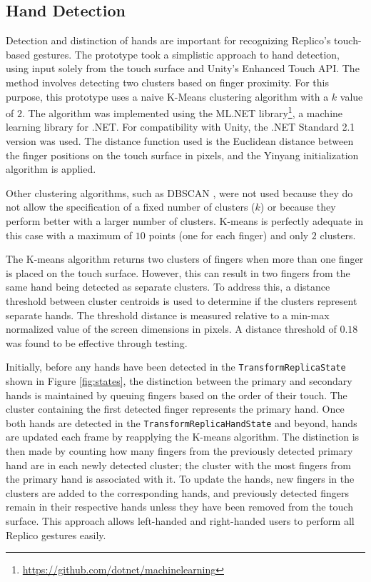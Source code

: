     \subsection{Hand Detection} \label{sec:hand}

        Detection and distinction of hands are important for recognizing Replico's touch-based gestures. The prototype took a simplistic approach to hand detection, using input solely from the touch surface and Unity's Enhanced Touch API. The method involves detecting two clusters based on finger proximity. For this purpose, this prototype uses a naive K-Means clustering algorithm \cite{zbMATH03340881, lloydLeastSquaresQuantization1982, 1571980074621944832} with a $k$ value of $2$. The algorithm was implemented using the ML.NET library\footnote{\url{https://github.com/dotnet/machinelearning}}, a machine learning library for .NET. For compatibility with Unity, the .NET Standard 2.1 version was used. The distance function used is the Euclidean distance between the finger positions on the touch surface in pixels, 
        and the Yinyang initialization algorithm \cite{pmlr-v37-ding15} is applied.
    
        Other clustering algorithms, such as DBSCAN \cite{ester1996density}, were not used because they do not allow the specification of a fixed number of clusters ($k$) or because they perform better with a larger number of clusters. K-means is perfectly adequate in this case with a maximum of $10$ points (one for each finger) and only $2$ clusters.
    
        The K-means algorithm returns two clusters of fingers when more than one finger is placed on the touch surface. However, this can result in two fingers from the same hand being detected as separate clusters. To address this, a distance threshold between cluster centroids is used to determine if the clusters represent separate hands. The threshold distance is measured relative to a min-max normalized value of the screen dimensions in pixels. A distance threshold of $0.18$ was found to be effective through testing.
    
        Initially, before any hands have been detected in the \lstinline{TransformReplicaState} shown in Figure \ref{fig:states}, the distinction between the primary and secondary hands is maintained by queuing fingers based on the order of their touch. The cluster containing the first detected finger represents the primary hand. Once both hands are detected in the \lstinline{TransformReplicaHandState} and beyond, hands are updated each frame by reapplying the K-means algorithm. The distinction is then made by counting how many fingers from the previously detected primary hand are in each newly detected cluster; the cluster with the most fingers from the primary hand is associated with it. To update the hands, new fingers in the clusters are added to the corresponding hands, and previously detected fingers remain in their respective hands unless they have been removed from the touch surface. This approach allows left-handed and right-handed users to perform all Replico gestures easily.

